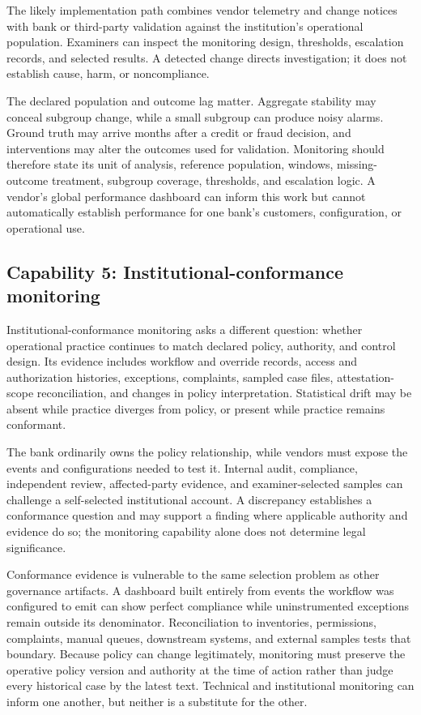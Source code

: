 The likely implementation path combines vendor telemetry and change notices
with bank or third-party validation against the institution's operational
population. Examiners can inspect the monitoring design, thresholds, escalation
records, and selected results. A detected change directs investigation; it does
not establish cause, harm, or noncompliance.

The declared population and outcome lag matter. Aggregate stability may conceal
subgroup change, while a small subgroup can produce noisy alarms. Ground truth
may arrive months after a credit or fraud decision, and interventions may alter
the outcomes used for validation. Monitoring should therefore state its unit of
analysis, reference population, windows, missing-outcome treatment, subgroup
coverage, thresholds, and escalation logic. A vendor's global performance
dashboard can inform this work but cannot automatically establish performance
for one bank's customers, configuration, or operational use.

\subsection{Capability 5: Institutional-conformance monitoring}
\label{sec:primitives:institutional-conformance}

Institutional-conformance monitoring asks a different question: whether
operational practice continues to match declared policy, authority, and control
design. Its evidence includes workflow and override records, access and
authorization histories, exceptions, complaints, sampled case files,
attestation-scope reconciliation, and changes in policy interpretation.
Statistical drift may be absent while practice diverges from policy, or present
while practice remains conformant.

The bank ordinarily owns the policy relationship, while vendors must expose the
events and configurations needed to test it. Internal audit, compliance,
independent review, affected-party evidence, and examiner-selected samples can
challenge a self-selected institutional account. A discrepancy establishes a
conformance question and may support a finding where applicable authority and
evidence do so; the monitoring capability alone does not determine legal
significance.

Conformance evidence is vulnerable to the same selection problem as other
governance artifacts. A dashboard built entirely from events the workflow was
configured to emit can show perfect compliance while uninstrumented exceptions
remain outside its denominator. Reconciliation to inventories, permissions,
complaints, manual queues, downstream systems, and external samples tests that
boundary. Because policy can change legitimately, monitoring must preserve the
operative policy version and authority at the time of action rather than judge
every historical case by the latest text. Technical and institutional
monitoring can inform one another, but neither is a substitute for the other.

